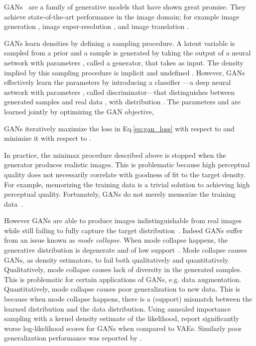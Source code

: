 \documentclass[11pt]{article}
\begin{document}
\Glspl{GAN}~\citep{goodfellow2014generative} are a family of generative models that have shown great promise.
They achieve state-of-the-art performance in the image domain; for example image generation \citep{karras2019style, brock2018large}, image super-resolution \citep{ledig2017photo}, and image translation \citep{isola2017image}. 

\glspl{GAN} learn densities by defining a sampling procedure. A latent variable  is sampled from a prior  and a sample  is generated by taking the output of a neural network with parameters , called a generator, that takes  as input. 
The density  implied by this sampling procedure is implicit and undefined \citep{mohamed2016learning}. However, \glspl{GAN} effectively learn the parameters  by introducing a classifier ---a deep neural network with parameters , called discriminator---that distinguishes between generated samples  and real data , with distribution . The parameters  and  are learned jointly by optimizing the \gls{GAN} objective,

\glspl{GAN} iteratively maximize the loss in Eq.\nobreakspace \ref {eq:gan_loss} with respect to  and minimize it with respect to . 

In practice, the minimax procedure described above is stopped when the generator produces realistic images. This is problematic because 
high perceptual quality does not necessarily correlate with goodness of fit to the target density. For example, memorizing the training data is a trivial solution to achieving high perceptual quality. Fortunately, \glspl{GAN} do not merely memorize the training data~\citep{zhang2017discrimination, arora2017generalization}. 

However \glspl{GAN} are able to produce images indistinguishable from real images while still failing to fully capture the target distribution~\citep{brock2018large, karras2019style}. Indeed \glspl{GAN} suffer from an issue known as \emph{mode collapse}. When mode collapse happens, the generative distribution  is degenerate and of low support~\citep{arora2017generalization, arora2018gans}. Mode collapse causes \glspl{GAN}, as density estimators, to fail both qualitatively and quantitatively. Qualitatively, mode collapse causes lack of diversity in the generated samples. This is problematic for certain applications of \glspl{GAN}, e.g. data augmentation. Quantitatively, mode collapse causes poor generalization to new data. This is because when mode collapse happens, there is a (support) mismatch between the learned distribution  and the data distribution. Using annealed importance sampling with a kernel density estimate of the likelihood, \citet{wu2016quantitative} report significantly worse log-likelihood scores for \glspl{GAN} when compared to \glspl{VAE}. Similarly poor generalization performance was reported by \citet{grover2018flow}. 
\end{document}
